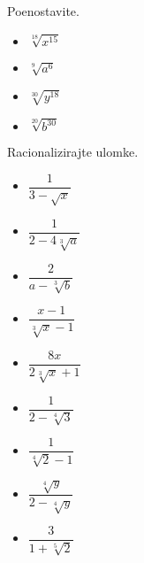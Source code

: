         
            \begin{naloga}
                Poenostavite.
                \begin{itemize}
                    \item $\displaystyle \sqrt[18]{x^{15}}$ 
                    \item $\displaystyle \sqrt[9]{a^6}$ 
                    \item $\displaystyle \sqrt[30]{y^{18}}$ 
                    \item $\displaystyle \sqrt[20]{b^{30}}$ 
                \end{itemize}
            \end{naloga}
        
        
            \begin{naloga}
                Racionalizirajte ulomke.
                \begin{multicols}{2}
                    \begin{itemize}
                        \item $\displaystyle \dfrac{1}{3-\sqrt{x}}$ 
                        \item $\displaystyle \dfrac{1}{2-4\sqrt[3]{a}}$ 
                        \item $\displaystyle \dfrac{2}{a-\sqrt[3]{b}}$ 
                        \item $\displaystyle \dfrac{x-1}{\sqrt[3]{x}-1}$ 
                        \item $\displaystyle \dfrac{8x}{2\sqrt[3]{x}+1}$ 
                        \item $\displaystyle \dfrac{1}{2-\sqrt[4]{3}}$ 
                        \item $\displaystyle \dfrac{1}{\sqrt[4]{2}-1}$ 
                        \item $\displaystyle \dfrac{\sqrt[4]{y}}{2-\sqrt[4]{y}}$ 
                        \item $\displaystyle \dfrac{3}{1+\sqrt[5]{2}}$ 
                    \end{itemize}
                \end{multicols}
            \end{naloga}
        
